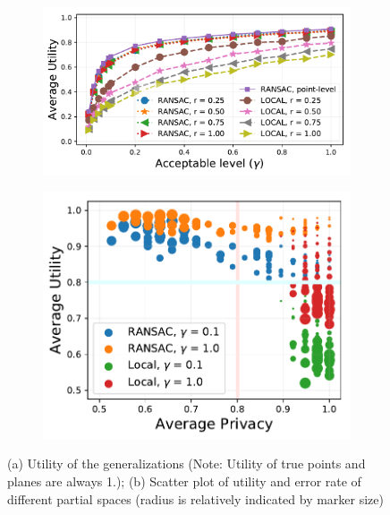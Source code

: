\begin{figure}[t]
	\begin{subfigure}[]{0.595\columnwidth}
		\vspace{-2mm}
    	\includegraphics[width=\textwidth]{figures/plots/2-utility}
    	\caption{}
    	\vspace{-2mm}
    	\label{fig:utility}
    \end{subfigure}
    \begin{subfigure}[]{0.395\columnwidth}
    	\vspace{-2mm}
    	\includegraphics[width=\textwidth]{figures/plots/utility-error-scatter}
    	\caption{}
    	\vspace{-2mm}
	    \label{fig:utility-scatter}
    \end{subfigure}
	\caption{(a) Utility of the generalizations {\small (Note: Utility of true points and planes are always 1.)}; (b) Scatter plot of utility and error rate of different partial spaces (radius is relatively indicated by marker size)}
    \vspace{-3mm}
\end{figure}

